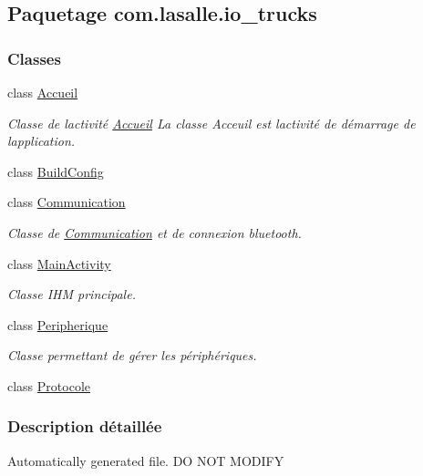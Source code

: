 \hypertarget{namespacecom_1_1lasalle_1_1io__trucks}{}\subsection{Paquetage com.\+lasalle.\+io\+\_\+trucks}
\label{namespacecom_1_1lasalle_1_1io__trucks}
\subsubsection*{Classes}
\begin{DoxyCompactItemize}
\item 
class \hyperlink{classcom_1_1lasalle_1_1io__trucks_1_1_accueil}{Accueil}
\begin{DoxyCompactList}\small\item\em Classe de l\textquotesingle{}activité \hyperlink{classcom_1_1lasalle_1_1io__trucks_1_1_accueil}{Accueil}  La classe Acceuil est l\textquotesingle{}activité de démarrage de l\textquotesingle{}application. \end{DoxyCompactList}\item 
class \hyperlink{classcom_1_1lasalle_1_1io__trucks_1_1_build_config}{Build\+Config}
\item 
class \hyperlink{classcom_1_1lasalle_1_1io__trucks_1_1_communication}{Communication}
\begin{DoxyCompactList}\small\item\em Classe de \hyperlink{classcom_1_1lasalle_1_1io__trucks_1_1_communication}{Communication} et de connexion bluetooth. \end{DoxyCompactList}\item 
class \hyperlink{classcom_1_1lasalle_1_1io__trucks_1_1_main_activity}{Main\+Activity}
\begin{DoxyCompactList}\small\item\em Classe I\+HM principale. \end{DoxyCompactList}\item 
class \hyperlink{classcom_1_1lasalle_1_1io__trucks_1_1_peripherique}{Peripherique}
\begin{DoxyCompactList}\small\item\em Classe permettant de gérer les périphériques. \end{DoxyCompactList}\item 
class \hyperlink{classcom_1_1lasalle_1_1io__trucks_1_1_protocole}{Protocole}
\end{DoxyCompactItemize}


\subsubsection{Description détaillée}
Automatically generated file. DO N\+OT M\+O\+D\+I\+FY 